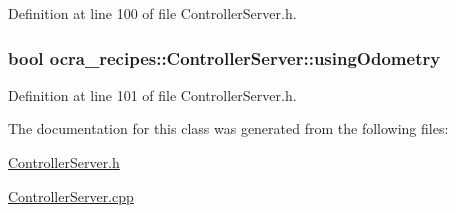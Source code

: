 Definition at line 100 of file Controller\+Server.\+h.

\subsubsection[{\texorpdfstring{using\+Odometry}{usingOdometry}}]{\setlength{\rightskip}{0pt plus 5cm}bool ocra\+\_\+recipes\+::\+Controller\+Server\+::using\+Odometry\hspace{0.3cm}{\ttfamily [protected]}}\hypertarget{classocra__recipes_1_1ControllerServer_afd126a8b289e29213468fe9e9a800dd2}{}\label{classocra__recipes_1_1ControllerServer_afd126a8b289e29213468fe9e9a800dd2}


Definition at line 101 of file Controller\+Server.\+h.



The documentation for this class was generated from the following files\+:\begin{DoxyCompactItemize}
\item 
\hyperlink{ControllerServer_8h}{Controller\+Server.\+h}\item 
\hyperlink{ControllerServer_8cpp}{Controller\+Server.\+cpp}\end{DoxyCompactItemize}
